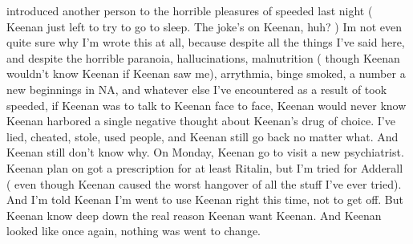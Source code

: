 \documentclass[12pt]{book}
\begin{document}
introduced another person to the horrible pleasures of speeded last night ( Keenan just left to try to go to sleep. The joke's on Keenan, huh? ) Im not even quite sure why I'm wrote this at all, because despite all the things I've said here, and despite the horrible paranoia, hallucinations, malnutrition ( though Keenan wouldn't know Keenan if Keenan saw me), arrythmia, binge smoked, a number a new beginnings in NA, and whatever else I've encountered as a result of took speeded, if Keenan was to talk to Keenan face to face, Keenan would never know Keenan harbored a single negative thought about Keenan's drug of choice. I've lied, cheated, stole, used people, and Keenan still go back no matter what. And Keenan still don't know why. On Monday, Keenan go to visit a new psychiatrist. Keenan plan on got a prescription for at least Ritalin, but I'm tried for Adderall ( even though Keenan caused the worst hangover of all the stuff I've ever tried). And I'm told Keenan I'm went to use Keenan right this time, not to get off. But Keenan know deep down the real reason Keenan want Keenan. And Keenan looked like once again, nothing was went to change.
\end{document}
